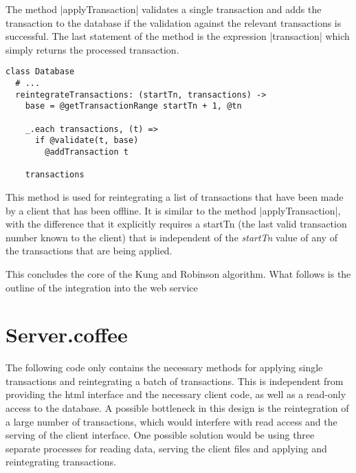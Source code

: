 The method |applyTransaction| validates a single transaction and adds the
transaction to the database if the validation against the relevant transactions
is successful. The last statement of the method is the expression |transaction|
which simply returns the processed transaction.


\begin{verbatim}
class Database
  # ...
  reintegrateTransactions: (startTn, transactions) ->
    base = @getTransactionRange startTn + 1, @tn

    _.each transactions, (t) =>
      if @validate(t, base)
        @addTransaction t

    transactions
\end{verbatim}

This method is used for reintegrating a list of transactions that have been made
by a client that has been offline. It is similar to the method
|applyTransaction|, with the difference that it explicitly requires a startTn
(the last valid transaction number known to the client) that is independent of
the \emph{startTn} value of any of the transactions that are being applied.

This concludes the core of the Kung and Robinson algorithm. What follows is the
outline of the integration into the web service

\pagebreak

\section{Server.coffee}

The following code only contains the necessary methods for applying single
transactions and reintegrating a batch of transactions. This is independent from
providing the html interface and the necessary client code, as well as a
read-only access to the database. A possible bottleneck in this design is the
reintegration of a large number of transactions, which would interfere with read
access and the serving of the client interface. One possible solution would be
using three separate processes for reading data, serving the client files and
applying and reintegrating transactions.


